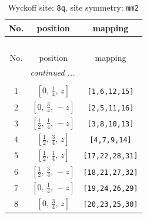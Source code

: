 \documentclass[fleqn,8pt]{jsarticle}
\begin{document}
\begin{longtable}{ccc}
\caption{Wyckoff site: {\tt 8q}, site symmetry: {\tt mm2}}
 \\
 \hline \hline
No. & position & mapping \\ \hline \endfirsthead

\multicolumn{2}{l}{\tablename\ \thetable{}} \\
 \hline \hline
No. & position & mapping \\ \hline \endhead

 \hline \hline
\multicolumn{2}{r}{\footnotesize\it continued ...} \\ \endfoot

 \hline \hline
\multicolumn{2}{r}{} \\ \endlastfoot

1 & $\left[ 0,\, \frac{1}{4},\, z \right]$ & {\tt [1,6,12,15]} \\ \hline
2 & $\left[ 0,\, \frac{3}{4},\, - z \right]$ & {\tt [2,5,11,16]} \\ \hline
3 & $\left[ \frac{1}{2},\, \frac{1}{4},\, - z \right]$ & {\tt [3,8,10,13]} \\ \hline
4 & $\left[ \frac{1}{2},\, \frac{3}{4},\, z \right]$ & {\tt [4,7,9,14]} \\ \hline
5 & $\left[ \frac{1}{2},\, \frac{1}{4},\, z \right]$ & {\tt [17,22,28,31]} \\ \hline
6 & $\left[ \frac{1}{2},\, \frac{3}{4},\, - z \right]$ & {\tt [18,21,27,32]} \\ \hline
7 & $\left[ 0,\, \frac{1}{4},\, - z \right]$ & {\tt [19,24,26,29]} \\ \hline
8 & $\left[ 0,\, \frac{3}{4},\, z \right]$ & {\tt [20,23,25,30]} \\
\end{longtable}
\renewcommand{\arraystretch}{1.2}
\end{document}

